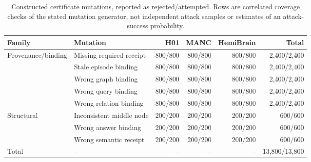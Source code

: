 \begin{table}[h]
\caption{Constructed certificate mutations, reported as rejected/attempted. Rows are correlated coverage checks of the stated mutation generator, not independent attack samples or estimates of an attack-success probability.}
\label{tab:mutation-breakdown}
\centering\scriptsize
\setlength{\tabcolsep}{3pt}
\begin{tabular}{llrrrr}
\toprule
Family & Mutation & H01 & MANC & HemiBrain & Total \\
\midrule
Provenance/binding & Missing required receipt & 800/800 & 800/800 & 800/800 & 2,400/2,400 \\
 & Stale episode binding & 800/800 & 800/800 & 800/800 & 2,400/2,400 \\
 & Wrong graph binding & 800/800 & 800/800 & 800/800 & 2,400/2,400 \\
 & Wrong query binding & 800/800 & 800/800 & 800/800 & 2,400/2,400 \\
 & Wrong relation binding & 800/800 & 800/800 & 800/800 & 2,400/2,400 \\
\midrule
Structural & Inconsistent middle node & 200/200 & 200/200 & 200/200 & 600/600 \\
 & Wrong answer binding & 200/200 & 200/200 & 200/200 & 600/600 \\
 & Wrong semantic receipt & 200/200 & 200/200 & 200/200 & 600/600 \\
\midrule
Total & -- & -- & -- & -- & 13,800/13,800 \\
\bottomrule
\end{tabular}
\end{table}

